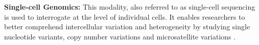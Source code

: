 \textbf{Single-cell Genomics: }This modality, also referred to as single-cell  sequencing is used to interrogate  at the level of individual cells. It enables researchers to better comprehend intercellular variation and heterogeneity by studying single nucleotide variants, copy number variations and microsatellite variations \textbf{\cite{stein_single-cell_2021,luquette_identification_2019,mallory_methods_2020,woodworth_building_2017}}.\\

